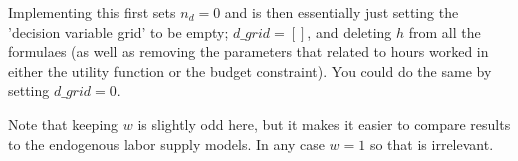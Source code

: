 Implementing this first sets $n_d=0$ and is then essentially just setting the 'decision variable grid' to be empty; $d\_{}grid=[]$, and deleting $h$ from all the formulaes (as well as removing the parameters that related to hours worked in either the utility function or the budget constraint). You could do the same by setting $d\_{}grid=0$.

Note that keeping $w$ is slightly odd here, but it makes it easier to compare results to the endogenous labor supply models. In any case $w=1$ so that is irrelevant.




